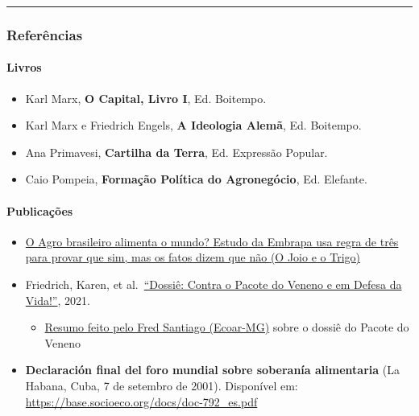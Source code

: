 \begin{center}\rule{0.5\linewidth}{0.5pt}\end{center}

\hypertarget{referuxeancias}{%
\subsubsection{Referências}\label{referuxeancias}}

\hypertarget{livros}{%
\paragraph{Livros}\label{livros}}

\begin{itemize}
\tightlist
\item
  Karl Marx, \textbf{O Capital, Livro I}, Ed. Boitempo.
\item
  Karl Marx e Friedrich Engels, \textbf{A Ideologia Alemã}, Ed.
  Boitempo.
\item
  Ana Primavesi, \textbf{Cartilha da Terra}, Ed. Expressão Popular.
\item
  Caio Pompeia, \textbf{Formação Política do Agronegócio}, Ed. Elefante.
\end{itemize}

\hypertarget{publicauxe7uxf5es}{%
\paragraph{Publicações}\label{publicauxe7uxf5es}}

\begin{itemize}
\tightlist
\item
  \href{https://ojoioeotrigo.com.br/2021/08/agro-alimenta-o-mundo/}{O
  Agro brasileiro alimenta o mundo? Estudo da Embrapa usa regra de três
  para provar que sim, mas os fatos dizem que não (O Joio e o Trigo)}
\item
  Friedrich, Karen, et
  al.~\href{https://editora.redeunida.org.br/wp-content/uploads/2021/07/Livro-Dossie-–-Contra-o-Pacote-do-Veneno-e-em-Defesa-da-Vida.pdf}{``Dossiê:
  Contra o Pacote do Veneno e em Defesa da Vida!''}, 2021.

  \begin{itemize}
  \tightlist
  \item
    \href{https://actually-shoe-d2e.notion.site/Dossi-Contra-o-pacote-do-veneno-e-em-defesa-da-vida-bddf885061704f3b9a6fca367c1efb88}{Resumo
    feito pelo Fred Santiago (Ecoar-MG)} sobre o dossiê do Pacote do
    Veneno
  \end{itemize}
\item
  \textbf{Declaración final del foro mundial sobre soberanía alimentaria}
  (La Habana, Cuba, 7 de setembro de 2001). Disponível em:
  \url{https://base.socioeco.org/docs/doc-792_es.pdf}
\end{itemize}

